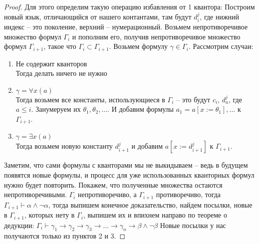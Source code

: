 \begin{proof}
Для этого определим такую операцию избавления от 1 квантора: Построим новый язык, отличающийся от нашего контантами, там будут $d_i^j$, где нижний индекс -- это поколение, верхний – нумерационный. Возьмем непротиворечивое множество формул $\Gamma_i$ и пополним его, получив непротиворечивое множество формул $\Gamma_{i+1}$, такое что $\Gamma_i \subset \Gamma_{i+1}$. Возьмем формулу $\gamma \in \Gamma_{i}$. Рассмотрим случаи:
\begin{enumerate}
\item Не содержит кванторов\\
Тогда делать ничего не нужно
\item $\gamma = \forall x (a)$\\
Тогда возьмем все константы, использующиеся в $\Gamma_{i}$ -- это будут $c_i$, $d_a^j$, где $a \leq i$. Занумеруем их $\theta_1, \theta_2, \dots$. И добавим формулы $a_1=a[x:=\theta_1], \dots$ к $\Gamma_{i+1}$.
\item $\gamma = \exists x (a)$\\
Тогда возьмем новую константу $d_{i+1}^j$ и добавим $a[x:=d_{i+1}^j]$ к $\Gamma_{i+1}$.
\end{enumerate}

Заметим, что сами формулы с кванторами мы не выкидываем -- ведь в будущем появятся новые формулы, и процесс для уже использованных кванторных формул нужно будет повторить. Покажем, что полученные множества остаются непротиворечивыми. $\Gamma_i$ непротиворечиво, а $\Gamma_{i+1}$ противоречиво, тогда $\Gamma_{i+1} \vdash \alpha \land \neg \alpha$, тогда выпишем конечное доказательство, найдем посылки, новые в $\Gamma_{i+1}$, которых нету в $\Gamma_{i}$, выпишем их и впихнем направо по теореме о дедукции: $\Gamma_{i} \vdash \gamma_1 \to \gamma_2 \to \gamma_3 \to \dots \to \gamma_n \to \beta \land \neg \beta$ Новые посылки у нас получаются только из пунктов 2 и 3.


\end{proof}
